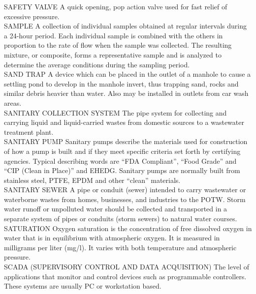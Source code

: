 \documentclass{article}
\begin{document}
SAFETY VALVE
A quick opening, pop action valve used for fast relief of excessive pressure.
\vspace{0.3cm}\\
SAMPLE
A collection of individual samples obtained at regular intervals during a 24-hour period. Each individual sample is combined with the others in proportion to the rate of flow when the sample was collected. The resulting mixture, or composite, forms a representative sample and is analyzed to determine the average conditions during the sampling period.
\vspace{0.3cm}\\
SAND TRAP
A device which can be placed in the outlet of a manhole to cause a settling pond to develop in the manhole invert, thus trapping sand, rocks and similar debris heavier than water. Also may be installed in outlets from car wash areas. 
\vspace{0.3cm}\\
SANITARY COLLECTION SYSTEM
The pipe system for collecting and carrying liquid and liquid-carried wastes from domestic sources to a wastewater treatment plant. 
\vspace{0.3cm}\\
SANITARY PUMP
Sanitary pumps describe the materials used for construction of how a pump is built and if they meet specific criteria set forth by certifying agencies. Typical describing words are “FDA Compliant”, “Food Grade” and “CIP (Clean in Place)” and EHEDG. Sanitary pumps are normally built from stainless steel, PTFE, EPDM and other “clean” materials.
\vspace{0.3cm}\\
SANITARY SEWER
A pipe or conduit (sewer) intended to carry wastewater or waterborne wastes from homes, businesses, and industries to the POTW. Storm water runoff or unpolluted water should be collected and transported in a separate system of pipes or conduits (storm sewers) to natural water courses. 
\vspace{0.3cm}\\
SATURATION
Oxygen saturation is the concentration of free dissolved oxygen in water that is in equilibrium with atmospheric oxygen. It is measured in milligrams per liter (mg/l). It varies with both temperature and atmospheric pressure.
\vspace{0.3cm}\\

SCADA (SUPERVISORY CONTROL AND DATA ACQUISITION)
The level of applications that monitor and control devices such as programmable controllers. These systems are usually PC or workstation based.
\vspace{0.3cm}\\
\end{document}
